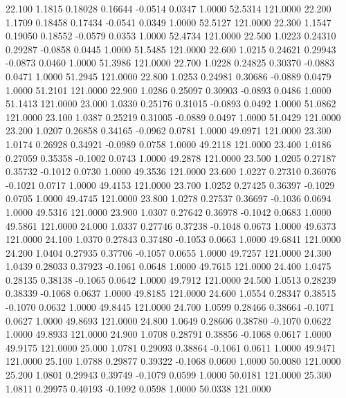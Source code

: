   22.100   1.1815   0.18028   0.16644  -0.0514   0.0347   1.0000  52.5314 121.0000
  22.200   1.1709   0.18458   0.17434  -0.0541   0.0349   1.0000  52.5127 121.0000
  22.300   1.1547   0.19050   0.18552  -0.0579   0.0353   1.0000  52.4734 121.0000
  22.500   1.0223   0.24310   0.29287  -0.0858   0.0445   1.0000  51.5485 121.0000
  22.600   1.0215   0.24621   0.29943  -0.0873   0.0460   1.0000  51.3986 121.0000
  22.700   1.0228   0.24825   0.30370  -0.0883   0.0471   1.0000  51.2945 121.0000
  22.800   1.0253   0.24981   0.30686  -0.0889   0.0479   1.0000  51.2101 121.0000
  22.900   1.0286   0.25097   0.30903  -0.0893   0.0486   1.0000  51.1413 121.0000
  23.000   1.0330   0.25176   0.31015  -0.0893   0.0492   1.0000  51.0862 121.0000
  23.100   1.0387   0.25219   0.31005  -0.0889   0.0497   1.0000  51.0429 121.0000
  23.200   1.0207   0.26858   0.34165  -0.0962   0.0781   1.0000  49.0971 121.0000
  23.300   1.0174   0.26928   0.34921  -0.0989   0.0758   1.0000  49.2118 121.0000
  23.400   1.0186   0.27059   0.35358  -0.1002   0.0743   1.0000  49.2878 121.0000
  23.500   1.0205   0.27187   0.35732  -0.1012   0.0730   1.0000  49.3536 121.0000
  23.600   1.0227   0.27310   0.36076  -0.1021   0.0717   1.0000  49.4153 121.0000
  23.700   1.0252   0.27425   0.36397  -0.1029   0.0705   1.0000  49.4745 121.0000
  23.800   1.0278   0.27537   0.36697  -0.1036   0.0694   1.0000  49.5316 121.0000
  23.900   1.0307   0.27642   0.36978  -0.1042   0.0683   1.0000  49.5861 121.0000
  24.000   1.0337   0.27746   0.37238  -0.1048   0.0673   1.0000  49.6373 121.0000
  24.100   1.0370   0.27843   0.37480  -0.1053   0.0663   1.0000  49.6841 121.0000
  24.200   1.0404   0.27935   0.37706  -0.1057   0.0655   1.0000  49.7257 121.0000
  24.300   1.0439   0.28033   0.37923  -0.1061   0.0648   1.0000  49.7615 121.0000
  24.400   1.0475   0.28135   0.38138  -0.1065   0.0642   1.0000  49.7912 121.0000
  24.500   1.0513   0.28239   0.38339  -0.1068   0.0637   1.0000  49.8185 121.0000
  24.600   1.0554   0.28347   0.38515  -0.1070   0.0632   1.0000  49.8445 121.0000
  24.700   1.0599   0.28466   0.38664  -0.1071   0.0627   1.0000  49.8693 121.0000
  24.800   1.0649   0.28606   0.38780  -0.1070   0.0622   1.0000  49.8933 121.0000
  24.900   1.0708   0.28791   0.38856  -0.1068   0.0617   1.0000  49.9175 121.0000
  25.000   1.0781   0.29093   0.38864  -0.1061   0.0611   1.0000  49.9471 121.0000
  25.100   1.0788   0.29877   0.39322  -0.1068   0.0600   1.0000  50.0080 121.0000
  25.200   1.0801   0.29943   0.39749  -0.1079   0.0599   1.0000  50.0181 121.0000
  25.300   1.0811   0.29975   0.40193  -0.1092   0.0598   1.0000  50.0338 121.0000

